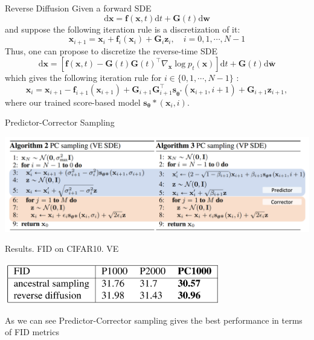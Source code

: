 \documentclass[xcolor=dvipsnames]{beamer}
\begin{document}
    \begin{frame}{Reverse Diffusion}
        Given a forward SDE
$$
\mathrm{d} \mathbf{x}=\mathbf{f}(\mathbf{x}, t) \mathrm{d} t+\mathbf{G}(t) \mathrm{d} \mathbf{w}
$$
and suppose the following iteration rule is a discretization of it:
$$
\mathbf{x}_{i+1}=\mathbf{x}_i+\mathbf{f}_i\left(\mathbf{x}_i\right)+\mathbf{G}_i \mathbf{z}_i, \quad i=0,1, \cdots, N-1
$$
Thus, one can propose to discretize the reverse-time SDE
$$
\mathrm{d} \mathbf{x}=\left[\mathbf{f}(\mathbf{x}, t)-\mathbf{G}(t) \mathbf{G}(t)^{\top} \nabla_{\mathbf{x}} \log p_t(\mathbf{x})\right] \mathrm{d} t+\mathbf{G}(t) \mathrm{d} \overline{\mathbf{w}}
$$
which gives the following iteration rule for $i \in\{0,1, \cdots, N-1\}$ :
$$
\mathbf{x}_i=\mathbf{x}_{i+1}-\mathbf{f}_{i+1}\left(\mathbf{x}_{i+1}\right)+\mathbf{G}_{i+1} \mathbf{G}_{i+1}^{\top} \mathbf{s}_{\boldsymbol{\theta}^*}\left(\mathbf{x}_{i+1}, i+1\right)+\mathbf{G}_{i+1} \mathbf{z}_{i+1},
$$
where our trained score-based model $\mathbf{s}_{\boldsymbol{\theta}} *\left(\mathbf{x}_i, i\right)$.
    \end{frame}

    \begin{frame}{Predictor-Corrector Sampling}
        \begin{center}
            \includegraphics[width=\textwidth]{pics/PC.png}
        \end{center}
    \end{frame}

    \begin{frame}{\hypertarget{frame:res-ve}{Results. FID on CIFAR10. VE}}            
        \begin{center}
            \includegraphics[width=0.7\textwidth]{pics/VE_table.png}
        \end{center}
        As we can see Predictor-Corrector sampling gives the best performance in terms of
        FID metrics
    \end{frame}
\end{document}
